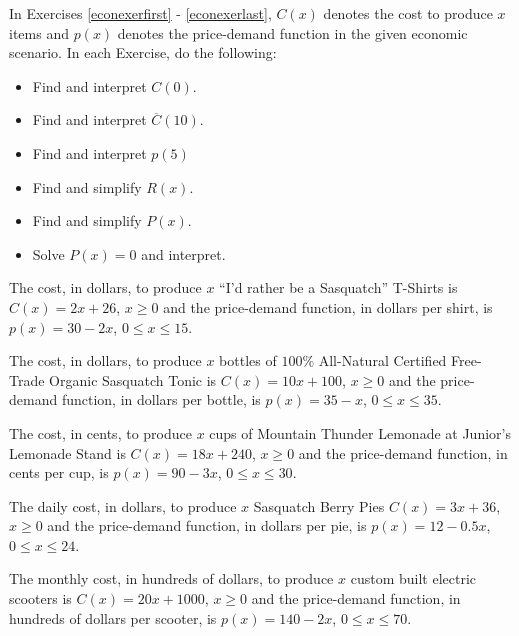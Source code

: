 \documentclass{ximera}
\begin{document}
\begin{question}
    

In Exercises \ref{econexerfirst} - \ref{econexerlast}, $C(x)$ denotes the cost to produce $x$ items and $p(x)$ denotes the price-demand function in the given economic scenario.  In each Exercise, do the following:

\begin{itemize}

\item  Find and interpret $C(0)$.
\item  Find and interpret $\overline{C}(10)$.
\item  Find and interpret $p(5)$
\item  Find and simplify $R(x)$.
\item  Find and simplify $P(x)$.
\item  Solve $P(x) = 0$ and interpret.
\end{itemize}

\begin{problem}\label{econexerfirst}
The cost, in dollars, to produce $x$ ``I'd rather be a Sasquatch'' T-Shirts is $C(x) = 2x+26$, $x \geq 0$ and the price-demand function, in dollars per shirt,  is $p(x) = 30 - 2x$, $0 \leq x \leq 15$. 
\end{problem}

\begin{problem}
The cost, in dollars, to produce $x$ bottles of $100 \%$ All-Natural Certified Free-Trade Organic Sasquatch Tonic is $C(x) = 10x+100$, $x \geq 0$ and the price-demand function, in dollars per bottle,  is $p(x) = 35 - x$, $0 \leq x \leq 35$. 
\end{problem}  

\begin{problem}
The cost, in cents, to produce $x$ cups of Mountain Thunder Lemonade at Junior's Lemonade Stand  is $C(x) = 18x + 240$, $x \geq 0$ and the price-demand function, in cents per cup,  is $p(x) = 90-3x$, $0 \leq x \leq 30$.
\end{problem} 

\begin{problem}
The daily cost, in dollars, to produce $x$ Sasquatch Berry Pies $C(x) = 3x + 36$, $x \geq 0$ and the price-demand function, in  dollars per pie,  is $p(x) = 12-0.5x$, $0 \leq x \leq 24$.
\end{problem} 

\begin{problem}\label{econexerlast}
The monthly cost, in hundreds of dollars, to produce $x$ custom built electric scooters is $C(x) = 20x + 1000$, $x \geq 0$ and the price-demand function, in  hundreds of dollars per scooter,  is $p(x) = 140-2x$, $0 \leq x \leq 70$.
\end{problem} 


\end{question}
\end{document}
